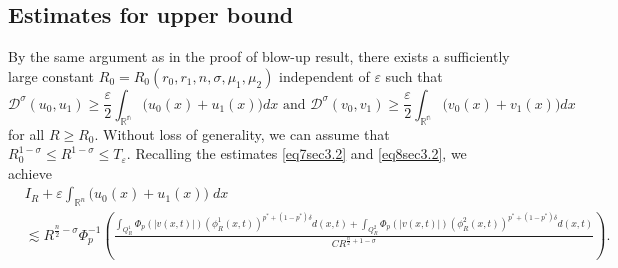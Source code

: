 \documentclass[11pt,reqno]{amsart}
\numberwithin{equation}{section}
\newcommand{\dps}{\displaystyle}
\theoremstyle{plain}
\begin{document}
\subsection{Estimates for upper bound}
By the same argument as in the proof of blow-up result, there exists a sufficiently large constant $R_0=R_0(r_0,r_1,n,\sigma,\mu_1,\mu_2)$ independent of $\varepsilon$ such that
\[
\mathcal{D}^{\sigma}(u_0,u_1)\geq \frac{\varepsilon}{2}\int_{\mathbb{R^n}}\big(u_0(x)+u_1(x)\big)dx\text{ and }\mathcal{D}^{\sigma}(v_0,v_1)\geq \frac{\varepsilon}{2}\int_{\mathbb{R^n}}\big(v_0(x)+v_1(x)\big)dx
\]
for all $R\geq R_0$. Without loss of generality, we can assume that $R^{1-\sigma}_0\leq R^{1-\sigma}\leq T_{\varepsilon} $. 
Recalling the estimates \eqref{eq7sec3.2} and \eqref{eq8sec3.2}, we achieve
\begin{equation}
\begin{aligned}
&I_R+\varepsilon\int_{\mathbb{R}^n}\big(u_0(x)+u_1(x)\big)\;dx\\
&\lesssim R^{\frac{n}{2}-\sigma}\Phi_p^{-1}\left(\frac{\dps\int_{Q^1_{R}} \Phi_p(|v(x, t)|)\left(\phi^1_R(x, t)\right)^{p^*+(1-p^*)\delta} d(x, t)+\dps\int_{Q^2_{R}} \Phi_p(|v(x, t)|)\left(\phi^2_R(x, t)\right)^{p^*+(1-p^*)\delta} d(x, t)}{CR^{\frac{n}{2}+1-\sigma}}\right).
\end{aligned}
\end{equation}
\end{document}
